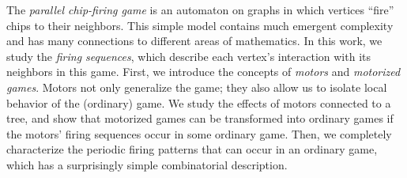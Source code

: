 The \emph{parallel chip-firing game} is an automaton on graphs in which
vertices ``fire'' chips to their neighbors. This simple model contains much
emergent complexity and has many connections to different areas of
mathematics. In this work, we study the \emph {firing sequences}, which
describe each vertex's interaction with its neighbors in this game. First, we
introduce the concepts of \emph{motors} and \emph{motorized games}. Motors not
only generalize the game; they also allow us to isolate local behavior of the
(ordinary) game. We study the effects of motors connected to a tree, and show
that motorized games can be transformed into ordinary games if the motors'
firing sequences occur in some ordinary game. Then, we completely characterize
the periodic firing patterns that can occur in an ordinary game, which has a
surprisingly simple combinatorial description.
